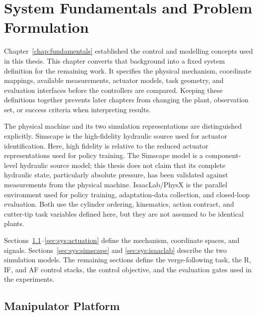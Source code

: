 \chapter{System Fundamentals and Problem Formulation}
\label{chap:system}

Chapter~\ref{chap:fundamentals} established the control and modelling concepts
used in this thesis. This chapter converts that background into a fixed system
definition for the remaining work. It specifies the physical mechanism,
coordinate mappings, available measurements, actuator models, task geometry,
and evaluation interfaces before the controllers are compared. Keeping these
definitions together prevents later chapters from changing the plant,
observation set, or success criteria when interpreting results.

The physical machine and its two simulation representations are distinguished
explicitly. Simscape is the high-fidelity hydraulic source used for actuator
identification. Here, high fidelity is relative to the reduced actuator
representations used for policy training. The Simscape model is a
component-level hydraulic source model; this thesis does not claim that its
complete hydraulic state, particularly absolute pressure, has been validated
against measurements from the physical machine. IsaacLab/PhysX is the parallel environment used for policy
training, adaptation-data collection, and closed-loop evaluation. Both use the
cylinder ordering, kinematics, action contract, and cutter-tip task variables
defined here, but they are not assumed to be identical plants.

Sections~\ref{sec:sys:platform}--\ref{sec:sys:actuation} define the mechanism,
coordinate spaces, and signals. Sections~\ref{sec:sys:simscape} and
\ref{sec:sys:isaaclab} describe the two simulation models. The remaining
sections define the verge-following task, the R, IF, and AF control stacks,
the control objective, and the evaluation gates used in the experiments.

\section{Manipulator Platform}
\label{sec:sys:platform}

